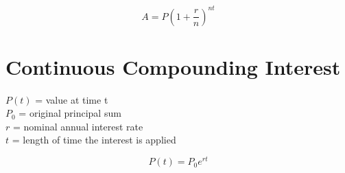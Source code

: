 \begin{equation*}
  A = P(1 + \frac{r}{n})^{nt}
\end{equation*}

\newpage

\section{Continuous Compounding Interest}

\noindent $P(t)$ = value at time t\\
$P_0$ = original principal sum\\
$r$ = nominal annual interest rate\\
$t$ = length of time the interest is applied

\begin{equation*}
  P(t) = P_0 e^{rt}
\end{equation*}